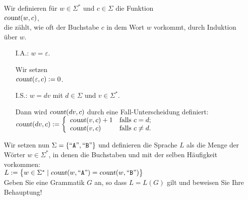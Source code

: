 \exercise
Wir definieren f\"ur $w \in \Sigma^*$ und $c \in \Sigma$ die Funktion
\\[0.2cm]
\hspace*{1.3cm}
$\textsl{count}(w,c)$,
\\[0.2cm]
die z\"ahlt, wie oft der Buchstabe $c$ in dem Wort $w$ vorkommt, durch Induktion \"uber $w$.
\begin{enumerate}
\item[I.A.:] $w = \varepsilon$.  

            Wir setzen
            \\[0.2cm]
            \hspace*{1.3cm}
            $\textsl{count}(\varepsilon, c) := 0$.
\item[I.S.:] $w = dv$ mit $d \in \Sigma$ und $v \in \Sigma^*$.  

            Dann wird $\textsl{count}(dv,c)$ durch eine Fall-Unterscheidung definiert:
            \\[0.2cm]
            \hspace*{1.3cm}
            $\textsl{count}(dv,c) := \left\{
             \begin{array}[c]{llr}
               \textsl{count}(v,c) + 1 & \mbox{falls $c     = d$}; \\
               \textsl{count}(v,c)     & \mbox{falls $c \not= d$}. \\
             \end{array}\right.
            $ \eox
\end{enumerate}
Wir setzen nun $\Sigma = \{ \mbox{``\texttt{A}''}, \mbox{``\texttt{B}''} \}$ und definieren die Sprache $L$ als die
Menge der W\"orter $w\in\Sigma^*$, in denen die Buchstaben  und  mit der
selben H\"aufigkeit vorkommen:
\\[0.2cm]
\hspace*{1.3cm}
$L := \bigl\{ w \in \Sigma^* \mid \textsl{count}(w,\mbox{``\texttt{A}''}) = \textsl{count}(w,\mbox{``\texttt{B}''})\bigr\}$
\\[0.2cm]
Geben Sie eine Grammatik $G$ an, so dass $L = L(G)$ gilt und beweisen Sie Ihre Behauptung!
\eox

